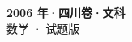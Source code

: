 \documentclass[zihao=-4, a4paper]{ctexart}
\begin{document}
\begin{center}
  {\Large\bfseries 2006 年·四川卷·文科}\\[4pt]
  {\large 数学 · 试题版}
\end{center}
\medskip
{}

\end{document}
